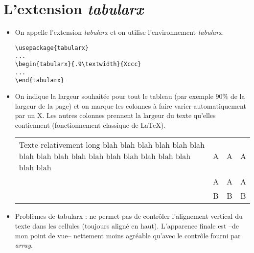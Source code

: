 







\section{L'extension \emph{tabularx}}

\vfill

\begin{itemize}
  
\item On appelle l'extension \emph{tabularx} et on utilise
  l'environnement \emph{tabularx}.

\begin{boxedminipage}{\textwidth}
\begin{verbatim}
\usepackage{tabularx}
...
\begin{tabularx}{.9\textwidth}{Xccc}
...
\end{tabularx}
\end{verbatim}
\end{boxedminipage}


\item On indique la largeur souhaitée pour tout le tableau (par
  exemple 90\% de la largeur de la page) et on marque les colonnes à
  faire varier automatiquement par un X. Les autres colonnes prennent
  la largeur du texte qu'elles contiennent (fonctionnement classique
  de \LaTeX).

\begin{tabularx}{.9\textwidth}{|X|ccc|} \hline
Texte relativement long blah blah blah blah blah blah blah blah blah blah blah blah blah blah blah blah blah blah & A & A & A \tabularnewline \cline{2-4}
& A & A & A \tabularnewline \cline{2-4}
& B & B & B \tabularnewline \hline
\end{tabularx}

\item Problèmes de tabularx : ne permet pas de contrôler l'alignement
  vertical du texte dans les cellules (toujours aligné en
  haut). L'apparence finale est --de mon point de vue-- nettement
  moins agréable qu'avec le contrôle fourni par \emph{array}.

\end{itemize}

